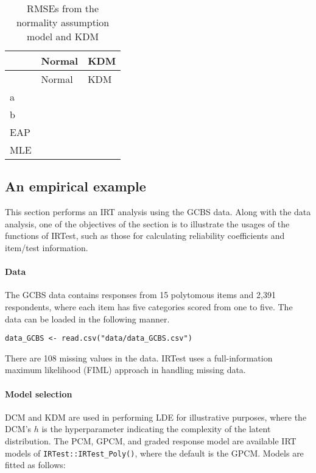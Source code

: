 \hypertarget{tab:rmse-static}{}
\begin{longtable}[]{@{}lll@{}}
\caption{RMSEs from the normality assumption model and KDM}\tabularnewline
\toprule\noalign{}
& Normal & KDM \\
\midrule\noalign{}
\endfirsthead
\toprule\noalign{}
& Normal & KDM \\
\midrule\noalign{}
\endhead
\bottomrule\noalign{}
\endlastfoot
a & & \\
b & & \\
EAP & & \\
MLE & & \\
\end{longtable}

\hypertarget{an-empirical-example}{%
\subsection{An empirical example}\label{an-empirical-example}}

This section performs an IRT analysis using the GCBS data. Along with
the data analysis, one of the objectives of the section is to illustrate
the usages of the functions of IRTest, such as those for calculating
reliability coefficients and item/test information.

\hypertarget{data}{%
\paragraph{Data}\label{data}}

The GCBS data contains responses from 15 polytomous items and 2,391
respondents, where each item has five categories scored from one to
five. The data can be loaded in the following manner.

\begin{verbatim}
data_GCBS <- read.csv("data/data_GCBS.csv")
\end{verbatim}

There are 108 missing values in the data. IRTest uses a full-information
maximum likelihood (FIML) approach in handling missing data.

\hypertarget{model-selection}{%
\paragraph{Model selection}\label{model-selection}}

DCM and KDM are used in performing LDE for illustrative purposes, where
the DCM's \(h\) is the hyperparameter indicating the complexity of the
latent distribution. The PCM, GPCM, and graded response model \citep[GRM:][]{Samejima:1969} are available IRT models of \texttt{IRTest::IRTest\_Poly()},
where the default is the GPCM. Models are fitted as follows:

